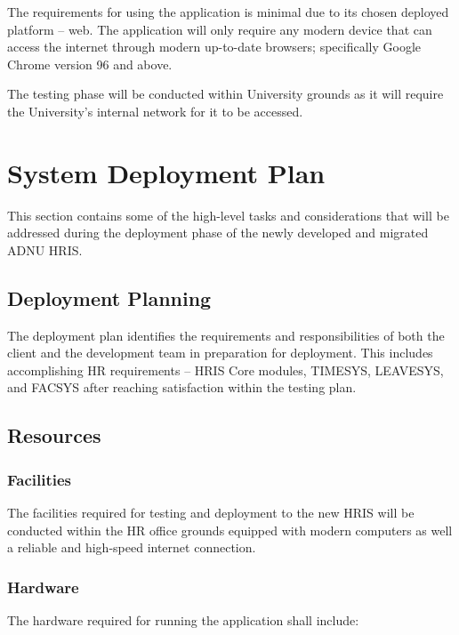     The requirements for using the application is minimal due to its chosen deployed platform -- web. The application will only require any modern device that can access the internet through modern up-to-date browsers; specifically Google Chrome version 96 and above. 
    
    The testing phase will be conducted within University grounds as it will require the University's internal network for it to be accessed. 

\section{System Deployment Plan}

This section contains some of the high-level tasks and considerations that will be addressed during the deployment phase of the newly developed and migrated ADNU HRIS.

    \subsection{Deployment Planning}
        
        The deployment plan identifies the requirements and responsibilities of both the client and the development team in preparation for deployment. This includes accomplishing HR requirements -- HRIS Core modules, TIMESYS, LEAVESYS, and FACSYS after reaching satisfaction within the testing plan.

    \subsection{Resources}
        \subsubsection{Facilities}

        The facilities required for testing and deployment to the new HRIS will be conducted within the HR office grounds equipped with modern computers as well a reliable and high-speed internet connection.

        \subsubsection{Hardware}

        The hardware required for running the application shall include:

